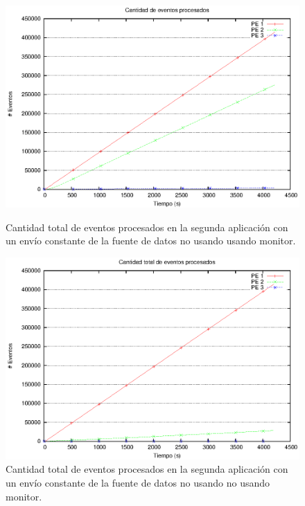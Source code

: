 \begin{figure}[ht]
\centering

\begin{minipage}[c]{0.45\textwidth}
\centering
    \includegraphics[width=\textwidth]{images/exp/app2/uniform/cm/eventCount.eps}
    \caption{Cantidad total de eventos procesados en la segunda aplicación con un envío constante de la fuente de datos no usando usando monitor.}
    \label{fig:app2-uniform-eventCount-cm}
\end{minipage} \hspace*{1cm}
\begin{minipage}[c]{0.45\textwidth}
\centering
    \includegraphics[width=\textwidth]{images/exp/app2/uniform/sm/eventCount.eps}
    \caption{Cantidad total de eventos procesados en la segunda aplicación con un envío constante de la fuente de datos no usando no usando monitor.}
    \label{fig:app2-uniform-eventCount-sm}
\end{minipage}

\end{figure}

